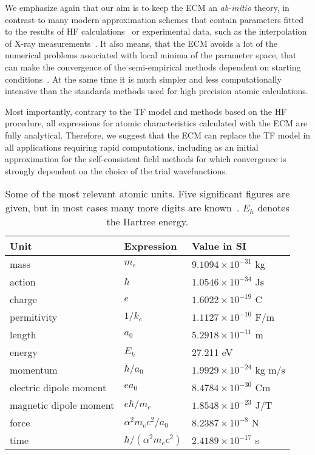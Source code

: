 We emphasize again that our aim is to keep the ECM an \textit{ab-initio} theory, in contrast to many modern approximation schemes that contain parameters fitted to the results of HF calculations~\cite{Koga1997} or experimental data, such as the interpolation of
X-ray measurements~\cite{genoni_can_2017}. It also means, that the ECM avoids a lot of the numerical problems associated with local minima of the parameter space, that can make the convergence of the semi-empirical methods dependent on starting conditions~\cite{PhysRevA36467}. At the same time it is much simpler and less computationally intensive than the standards methods used for high precision atomic calculations.

Most importantly, contrary to the TF model and methods based on the HF procedure, all expressions for atomic characteristics calculated with the ECM are fully analytical. Therefore, we suggest that the ECM can replace the TF model in all applications requiring rapid computations, including as an initial approximation for the self-consistent field methods for which convergence is strongly dependent on the choice of the trial wavefunctions.

\begin{table}
    \centering
    \begin{tabular}{l|ll}
        Unit & Expression & Value in SI \\
        \hline \hline
        mass & $m_e$ & $9.1094 \times 10^{-31}$ kg\\
        action & $\hbar$ & $1.0546 \times 10^{-34}$ Js \\
        charge & $e$ & $1.6022 \times 10^{-19}$ C\\
        permitivity & $1/k_e$ & $1.1127 \times 10^{-10}$ F/m\\
        length & $a_0$ & $5.2918 \times 10^{-11}$ m \\
        energy & $E_h$ & 27.211 eV \\
        momentum & $\hbar/a_0$ & $1.9929 \times 10^{-24}$ kg m/s\\
        electric dipole moment & $e a_0$ & $8.4784 \times 10^{-30}$ Cm\\
        magnetic dipole moment & $e \hbar/m_e$ & $1.8548 \times 10^{-23}$ J/T \\
        force & $\alpha^2 m_e c^2 /a_0$ & $8.2387 \times 10^{-8}$ N \\
        time & $\hbar/(\alpha^2 m_e c^2)$ & $2.4189 \times 10^{-17}$ s \\
        \hline
    \end{tabular}
    \caption{Some of the most relevant atomic units. Five significant figures are given, but in most cases many more digits are known~\cite{1959Natur1841559S}. $E_h$ denotes the Hartree energy.}
    \label{tab:units}
\end{table}

